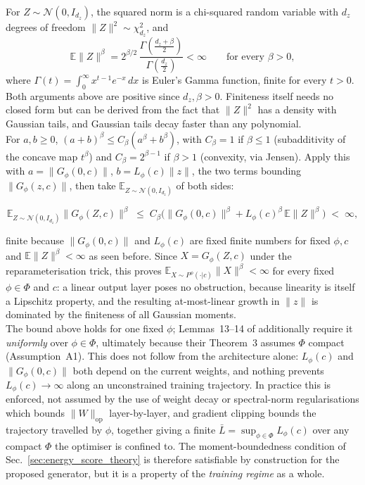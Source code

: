\begin{appendices}
For $Z\sim\mathcal N(0,I_{d_z})$, the squared norm is a chi-squared random variable with $d_z$ degrees of freedom $\|Z\|^2\sim\chi^2_{d_z}$, and
\[
\mathbb{E}\|Z\|^\beta = 2^{\beta/2}\,\frac{\Gamma\!\left(\tfrac{d_z+\beta}{2}\right)}{\Gamma\!\left(\tfrac{d_z}{2}\right)} <\infty \qquad\text{for every }\beta>0,
\]
where $\Gamma(t)=\int_0^\infty x^{t-1}e^{-x}\,dx$ is Euler's Gamma function, finite for every $t>0$. 
Both arguments above are positive since $d_z,\beta>0$.
Finiteness itself needs no closed form but can be derived from the fact that $\|Z\|^2$ has a density with Gaussian tails,
and Gaussian tails decay faster than any polynomial.\\

For $a,b\ge0$, $(a+b)^\beta\le C_\beta(a^\beta+b^\beta)$, 
with $C_\beta=1$ if $\beta\le1$ (subadditivity of the concave 
map $t^\beta$) and $C_\beta=2^{\beta-1}$ if $\beta>1$ (convexity, 
via Jensen). Apply this with $a=\|G_\phi(0,c)\|$, $b=L_\phi(c)\|z\|$, 
the two terms bounding $\|G_\phi(z,c)\|$, 
then take $\mathbb{E}_{Z\sim\mathcal N(0,I_{d_z})}$ of both sides:

\[
\mathbb{E}_{Z\sim\mathcal N(0,I_{d_z})}\|G_\phi(Z,c)\|^\beta
\;\le\;
C_\beta\Big(\|G_\phi(0,c)\|^\beta + L_\phi(c)^\beta\,\mathbb{E}\|Z\|^\beta\Big)
\;<\;\infty,
\]

finite because $\|G_\phi(0,c)\|$ and $L_\phi(c)$ are 
fixed finite numbers for fixed $\phi,c$ 
and $\mathbb{E}\|Z\|^\beta<\infty$ as seen before. 
Since $X=G_\phi(Z,c)$ 
under the reparameterisation trick, 
this proves $\mathbb{E}_{X\sim P^\phi(\cdot|c)}\|X\|^\beta<\infty$ 
for every fixed $\phi\in\Phi$ and $c$: 
a linear output layer poses no obstruction, 
because linearity is itself a Lipschitz property, 
and the resulting at-most-linear growth in $\|z\|$ 
is dominated by the finiteness of all Gaussian moments.\\

The bound above holds for one fixed $\phi$; 
Lemmas~13--14 of \cite{srforgan:srforgan} 
additionally require it \emph{uniformly} over 
$\phi\in\Phi$, ultimately because their Theorem~3 
assumes $\Phi$ compact (Assumption~A1). 
This does not follow from the architecture 
alone: $L_\phi(c)$ and $\|G_\phi(0,c)\|$ both 
depend on the current weights, and nothing 
prevents $L_\phi(c)\to\infty$ along an 
unconstrained training trajectory. In practice this 
is enforced, not assumed by the use of weight decay or spectral-norm 
regularisations which bounds $\|W\|_{\mathrm{op}}$ 
layer-by-layer, and gradient clipping bounds 
the trajectory travelled by $\phi$, together 
giving a finite $\bar L=\sup_{\phi\in\Phi}L_\phi(c)$ 
over any compact $\Phi$ the optimiser is confined to. 
The moment-boundedness condition of Sec.~\ref{sec:energy_score_theory} 
is therefore satisfiable by construction 
for the proposed generator, 
but it is a property of the \emph{training regime} as a whole.\\



\end{appendices}
